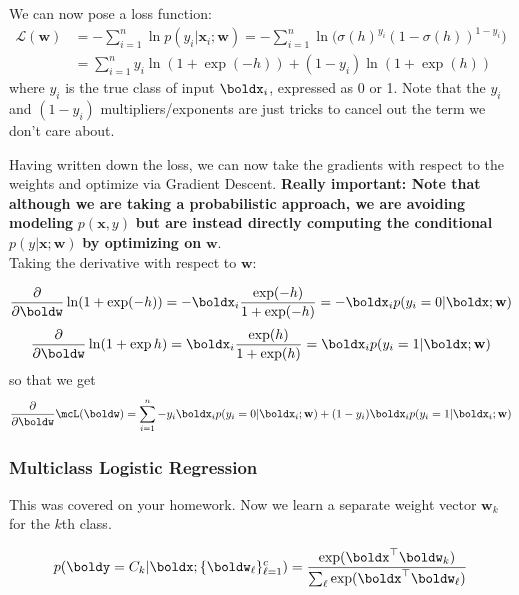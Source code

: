 \documentclass[12pt,letterpaper]{article}
\newcommand{\1}{\mathbbm{1}}
\begin{document}
\noindent
We can now pose a loss function:
\begin{align}
    \mathcal{L}(\mathbf{w}) &= -\sum_{i=1}^n \ln p(y_i | \mathbf{x}_i; \mathbf{w}) = -\sum_{i=1}^n \ln \bigg(\sigma(h)^{y_i}(1 - \sigma(h))^{1 - y_i}\bigg) \\
&= \sum_{i=1}^n y_i \ln(1 + \exp(-h)) + (1 - y_i)\ln(1 + \exp(h))
\end{align}
where $y_i$ is the true class of input $\boldx_i$, expressed as 0 or 1. Note that the $y_i$ and $(1 - y_i)$ multipliers/exponents are just tricks to cancel out the term we don't care about.


\noindent 
Having written down the loss, we can now take the gradients with respect to the weights and optimize via Gradient Descent. \textbf{Really important: Note that although we are taking a probabilistic approach, we are avoiding modeling} $p(\mathbf{x},y)$ \textbf{but are instead directly computing the conditional}  $p(y|\mathbf{x};\mathbf{w})$ \textbf{by optimizing on} $\mathbf{w}$.\\

\noindent
Taking the derivative with respect to $\mathbf{w}$:

\begin{align}
  \frac{\partial}{\partial \boldw} \ln(1+\exp(-h)) = -\boldx_i \frac{\exp(-h)} {1+\exp(-h)} = -\boldx_i p(y_i=0|\boldx;\mathbf{w})
\end{align}
\begin{align}
  \frac{\partial}{\partial \boldw} \ln(1+\exp h) = \boldx_i \frac{\exp(h)}{1+\exp(h)} =  \boldx_i  p(y_i =1| \boldx;\mathbf{w})
\end{align}
so that we get
\begin{align}
\frac{\partial}{\partial \boldw} \mcL(\boldw) = \sum_{i=1}^n
     -y_i \boldx_i p(y_i=0|\boldx_i;\mathbf{w}) + 
     (1-y_i) \boldx_i p(y_i=1|\boldx_i;\mathbf{w})
\end{align}


\subsubsection{Multiclass Logistic Regression}

\noindent 
This was covered on your homework. Now we learn a separate weight vector $\mathbf{w}_k$ for the $k$th class.

\begin{align}
p(\boldy = C_k| \boldx; \{ \boldw_{\ell}\}_{\ell =1}^c) = \frac{\exp(\boldx^\top \boldw_k  )}{\sum_{\ell} \exp(\boldx^\top \boldw_{\ell})}
\end{align}
\end{document}
